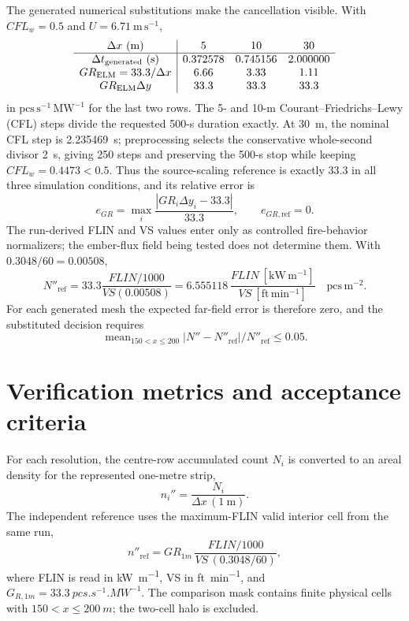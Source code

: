 The generated numerical substitutions make the cancellation visible.  With
\(CFL_w=0.5\) and \(U=6.71~\mathrm{m\,s^{-1}}\),
\[
\begin{array}{c|ccc}
\Delta x~(\mathrm{m})&5&10&30\\\hline
\Delta t_{\rm generated}~(\mathrm{s})&0.372578&0.745156&2.000000\\
GR_{\mathrm{ELM}}=33.3/\Delta x&6.66&3.33&1.11\\
GR_{\mathrm{ELM}}\Delta y&33.3&33.3&33.3
\end{array}
\]
in \(\mathrm{pcs\,s^{-1}\,MW^{-1}}\) for the last two rows. The 5- and 10-m Courant--Friedrichs--Lewy (CFL) steps divide the requested 500-s duration exactly. At 30~m, the nominal CFL step is 2.235469~s; preprocessing selects the conservative whole-second divisor 2~s, giving 250 steps and preserving the 500-s stop while keeping \(CFL_w=0.4473<0.5\). Thus the
source-scaling reference is exactly 33.3 in all three simulation conditions, and its
relative error is
\[
 e_{GR}=\max_i\frac{|GR_i\Delta y_i-33.3|}{33.3},
 \qquad e_{GR,\mathrm{ref}}=0.
\]
The run-derived FLIN and VS values enter only as controlled fire-behavior
normalizers; the ember-flux field being tested does not determine them.  With
\(0.3048/60=0.00508\),
\[
 N''_{\mathrm{ref}}
 =33.3\frac{FLIN/1000}{VS(0.00508)}
 =6.555118\,\frac{FLIN~[\mathrm{kW\,m^{-1}}]}
                   {VS~[\mathrm{ft\,min^{-1}}]}
 \quad\mathrm{pcs\,m^{-2}}.
\]
For each generated mesh the expected far-field error is therefore zero, and
the substituted decision requires
\[\operatorname{mean}_{150<x\leq200}|N''-N''_{\mathrm{ref}}|/
N''_{\mathrm{ref}}\leq0.05.\]

\section{Verification metrics and acceptance criteria}

For each resolution, the centre-row accumulated count \(N_i\) is converted to
an areal density for the represented one-metre strip,
\[
 n_i''=\frac{N_i}{\Delta x\,(1\ \mathrm{m})}.
\]
The independent reference uses the maximum-FLIN valid interior cell from the
same run,
\[
 n''_{\mathrm{ref}}=GR_{1m}\,
 \frac{FLIN/1000}{VS\,(0.3048/60)},
\]
where FLIN is read in \si{kW.m^{-1}}, VS in \si{ft.min^{-1}}, and
\(G_{R,1m}=\SI{33.3}{pcs.s^{-1}.MW^{-1}}\). The comparison mask contains
finite physical cells with \(150<x\le\SI{200}{m}\); the two-cell halo is
excluded.


